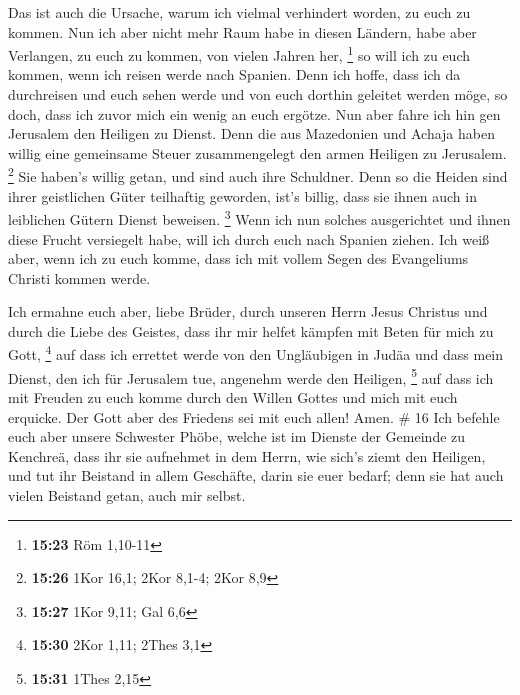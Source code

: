  Das ist auch die Ursache, warum ich vielmal verhindert
worden, zu euch zu kommen.  Nun ich aber nicht mehr Raum
habe in diesen Ländern, habe aber Verlangen, zu euch zu kommen, von
vielen Jahren her, \footnote{\textbf{15:23} Röm 1,10-11} 
so will ich zu euch kommen, wenn ich reisen werde nach Spanien. Denn ich
hoffe, dass ich da durchreisen und euch sehen werde und von euch dorthin
geleitet werden möge, so doch, dass ich zuvor mich ein wenig an euch
ergötze.  Nun aber fahre ich hin gen Jerusalem den Heiligen
zu Dienst.  Denn die aus Mazedonien und Achaja haben willig
eine gemeinsame Steuer zusammengelegt den armen Heiligen zu Jerusalem.
\footnote{\textbf{15:26} 1Kor 16,1; 2Kor 8,1-4; 2Kor 8,9} 
Sie haben's willig getan, und sind auch ihre Schuldner. Denn so die
Heiden sind ihrer geistlichen Güter teilhaftig geworden, ist's billig,
dass sie ihnen auch in leiblichen Gütern Dienst beweisen. \footnote{\textbf{15:27}
  1Kor 9,11; Gal 6,6}  Wenn ich nun solches ausgerichtet
und ihnen diese Frucht versiegelt habe, will ich durch euch nach Spanien
ziehen.  Ich weiß aber, wenn ich zu euch komme, dass ich
mit vollem Segen des Evangeliums Christi kommen werde.

 Ich ermahne euch aber, liebe Brüder, durch unseren Herrn
Jesus Christus und durch die Liebe des Geistes, dass ihr mir helfet
kämpfen mit Beten für mich zu Gott, \footnote{\textbf{15:30} 2Kor 1,11;
  2Thes 3,1}  auf dass ich errettet werde von den
Ungläubigen in Judäa und dass mein Dienst, den ich für Jerusalem tue,
angenehm werde den Heiligen, \footnote{\textbf{15:31} 1Thes 2,15}
 auf dass ich mit Freuden zu euch komme durch den Willen
Gottes und mich mit euch erquicke.  Der Gott aber des
Friedens sei mit euch allen! Amen. \# 16  Ich befehle euch
aber unsere Schwester Phöbe, welche ist im Dienste der Gemeinde zu
Kenchreä,  dass ihr sie aufnehmet in dem Herrn, wie sich's
ziemt den Heiligen, und tut ihr Beistand in allem Geschäfte, darin sie
euer bedarf; denn sie hat auch vielen Beistand getan, auch mir selbst.

